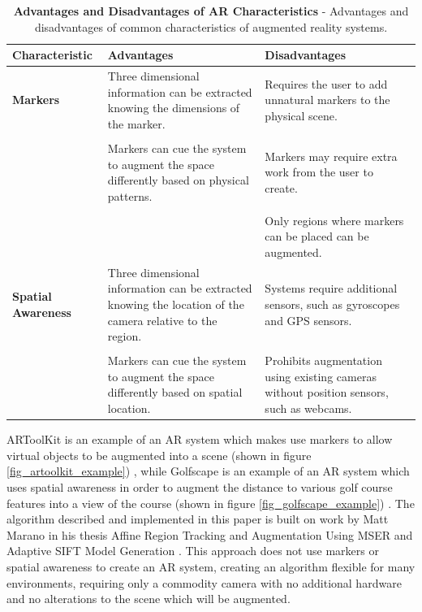 \documentclass[oneside,11pt]{Latex/Classes/PhDthesisPSnPDF}
\begin{document}
\begin{table}[h]
\centering
\begin{tabular}{| p{2.5cm} | p{5.5cm} | p{5.5cm} |} 
\hline
{\bf Characteristic} & {\bf Advantages} & {\bf Disadvantages} \\ \hline

{\bf Markers} & Three dimensional information can be extracted knowing the dimensions of the marker. & Requires the user to add unnatural markers to the physical scene. \\
 & & \\
 & Markers can cue the system to augment the space differently based on physical patterns. & Markers may require extra work from the user to create. \\
 & & \\
 & & Only regions  where markers can be placed can be augmented. \\ \hline

{\bf Spatial Awareness} & Three dimensional information can be extracted knowing the location of the camera relative to the region. & Systems require additional sensors, such as gyroscopes and GPS sensors. \\
 & & \\
 & Markers can cue the system to augment the space differently based on spatial location. & Prohibits augmentation using existing cameras without position sensors, such as webcams. \\ \hline
\end{tabular}
\caption[Advantages and Disadvantages of AR Characteristics]{\textbf{Advantages and Disadvantages of AR Characteristics} - Advantages and disadvantages of common characteristics of augmented reality systems.}
\label{table_characteristics}
\end{table}

ARToolKit is an example of an AR system which makes use markers to allow virtual objects to be augmented into a scene (shown in figure \ref{fig_artoolkit_example}) \cite{kato_99}, while Golfscape is an example of an AR system which uses spatial awareness in order to augment the distance to various golf course features into a view of the course (shown in figure \ref{fig_golfscape_example}) \cite{golfscape_10}.  The algorithm described and implemented in this paper is built on work by Matt Marano in his thesis Affine Region Tracking and Augmentation Using MSER and Adaptive SIFT Model Generation \cite{marano_09}.  This approach does not use markers or spatial awareness to create an AR system, creating an algorithm flexible for many environments, requiring only a commodity camera with no additional hardware and no alterations to the scene which will be augmented.
\end{document}
